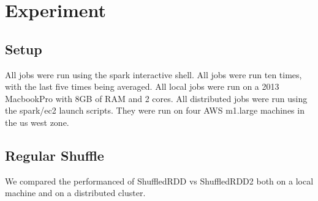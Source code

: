 \chapter{Experiment}

\section{Setup}

All jobs were run using the spark interactive shell.
All jobs were run ten times, with the last five times being averaged.
All local jobs were run on a 2013 MacbookPro with 8GB of RAM and 2 cores.
All distributed jobs were run using the spark/ec2 launch scripts. They were run on 
four AWS m1.large machines in the us west zone. 
\section{Regular Shuffle}

We compared the performanced of ShuffledRDD vs ShuffledRDD2 both on a local machine and on a distributed cluster.

